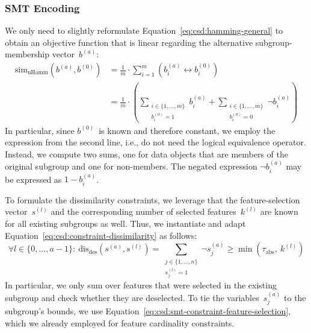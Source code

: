 \documentclass{article}
\theoremstyle{definition}
\begin{document}
\subsubsection{SMT Encoding}
\label{sec:csd:approach:alternatives:smt}

We only need to slightly reformulate Equation~\ref{eq:csd:hamming-general} to obtain an objective function that is linear regarding the alternative subgroup-membership vector~$b^{(a)}$:
%
\begin{equation}
	\begin{aligned}
		\text{sim}_{\text{nHamm}}(b^{(a)}, b^{(0)}) &= \frac{1}{m} \cdot \sum_{i=1}^m \left( b_i^{(a)} \leftrightarrow b_i^{(0)} \right) \\
		&= \frac{1}{m} \cdot \left( \sum\limits_{\substack{i \in \{1, \dots, m\} \\ b_i^{(0)} = 1}} b_i^{(a)} + \sum\limits_{\substack{i \in \{1, \dots, m\} \\ b_i^{(0)} = 0}} \lnot b_i^{(a)} \right)
	\end{aligned}
	\label{eq:csd:smt-hamming}
\end{equation}
%
In particular, since $b^{(0)}$~is known and therefore constant, we employ the expression from the second line, i.e., do not need the logical equivalence operator.
Instead, we compute two sums, one for data objects that are members of the original subgroup and one for non-members.
The negated expression $\lnot b_i^{(a)}$ may be expressed as $1 - b_i^{(a)}$.

To formulate the dissimilarity constraints, we leverage that the feature-selection vector~$s^{(l)}$ and the corresponding number of selected features~$k^{(l)}$ are known for all existing subgroups as well.
Thus, we instantiate and adapt Equation~\ref{eq:csd:constraint-dissimilarity} as follows:
%
\begin{equation}
	\forall l \in \{0, \dots, a-1\}:~ \text{dis}_{\text{des}}(s^{(a)}, s^{(l)}) = \sum_{\substack{j \in \{1, \dots, n\} \\ s^{(l)}_j = 1}} \lnot s^{(a)}_j \geq \min \left( \tau_{\text{abs}},~k^{(l)} \right)
	\label{eq:csd:smt-constraint-dissimilarity}
\end{equation}
%
In particular, we only sum over features that were selected in the existing subgroup and check whether they are deselected.
To tie the variables~$s^{(a)}_j$ to the subgroup's bounds, we use Equation~\ref{eq:csd:smt-constraint-feature-selection}, which we already employed for feature cardinality constraints.
\end{document}
